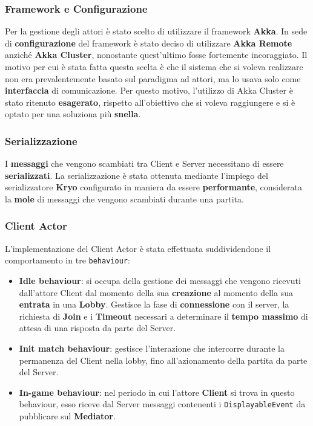 \subsubsection{Framework e Configurazione}
Per la gestione degli attori è stato scelto di utilizzare il framework \textbf{Akka}. In sede di \textbf{configurazione} del framework è stato deciso di utilizzare \textbf{Akka Remote} anziché \textbf{Akka Cluster}, nonostante quest'ultimo fosse fortemente incoraggiato. Il motivo per cui è stata fatta questa scelta è che il sistema che si voleva realizzare non era prevalentemente basato sul paradigma ad attori, ma lo usava solo come \textbf{interfaccia} di comunicazione. Per questo motivo, l'utilizzo di Akka Cluster è stato ritenuto \textbf{esagerato}, rispetto all'obiettivo che si voleva raggiungere e si è optato per una soluziona più \textbf{snella}.

\subsubsection{Serializzazione}
I \textbf{messaggi} che vengono scambiati tra Client e Server necessitano di essere \textbf{serializzati}. La serializzazione è stata ottenuta mediante l'impiego del serializzatore \textbf{Kryo} configurato in maniera da essere \textbf{performante}, considerata la \textbf{mole} di messaggi che vengono scambiati durante una partita.  

\subsubsection{Client Actor}
L'implementazione del Client Actor è stata effettuata suddividendone il comportamento in tre \texttt{behaviour}:
\begin{itemize}
    \item \textbf{Idle behaviour}: si occupa della gestione dei messaggi che vengono ricevuti dall'attore Client dal momento della sua \textbf{creazione} al momento della sua \textbf{entrata} in una \textbf{Lobby}. Gestisce la fase di \textbf{connessione} con il server, la richiesta di \textbf{Join} e i \textbf{Timeout} necessari a determinare il \textbf{tempo massimo} di attesa di una risposta da parte del Server.
    \item \textbf{Init match behaviour}: gestisce l'interazione che intercorre durante la permanenza del Client nella lobby, fino all'azionamento della partita da parte del Server.
    \item \textbf{In-game behaviour}: nel periodo in cui l'attore \textbf{Client} si trova in questo behaviour, esso riceve dal Server messaggi contenenti i \texttt{DisplayableEvent} da pubblicare sul \textbf{Mediator}.
\end{itemize}
